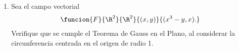\documentclass[a4,11pt]{aleph-examen}
\begin{document}
\begin{preguntas}
\begin{respuesta}
\begin{respuesta}
\begin{respuesta}
\begin{enumerate}
\begin{respuesta}
    Finalmente
   \[
       \oint_{\delta R}FdS=\int_\alpha FdS+\int_\beta FdS+\int_\gamma FdS
    \]
    donde
    \begin{align*}
        \int_\alpha FdS&=\iint_\alpha F(\alpha(r,t))\cdot N_\alpha dtdr\\
        &=\int_0^1\int_0^{2\pi} -2r\sen (t) dtdr\\
        &=0,
    \end{align*}
    
    \begin{align*}
        \int_\beta FdS&=\iint_\beta F(\beta(r,t))\cdot N_\beta dtdr\\
        &=\int_0^1\int_0^{2\pi} r(2+r\sen (t))dtdr\\
        &=2\pi
    \end{align*} 
    y
    \begin{align*}
        \int_\gamma FdS&=\iint_\gamma F(\gamma(r,t))\cdot N_\gamma dtdx\\
        &=\int_0^2\int_0^{2\pi} (\cos^2(t)+2\sen(t)\cos(t)-x\sen(t)) dtdx\\
        &=2\pi.
    \end{align*}
    Entonces 
    \[
        \oint_{\delta R}FdS=4\pi,
    \]
    con lo cual se verifica lo propuesto.

   
   
\end{respuesta}
\item 
    Sea el campo vectorial
    \[
        \funcion{F}{\R^2}{\R^2}{(x,y)}{(x^3-y,x).}
    \]
    Verifique que se cumple el Teorema de Gauss en el Plano, al considerar la circunferencia centrada en el origen de radio 1.


\end{enumerate}
\end{respuesta}
\end{respuesta}
\end{respuesta}
\end{preguntas}
\end{document}
